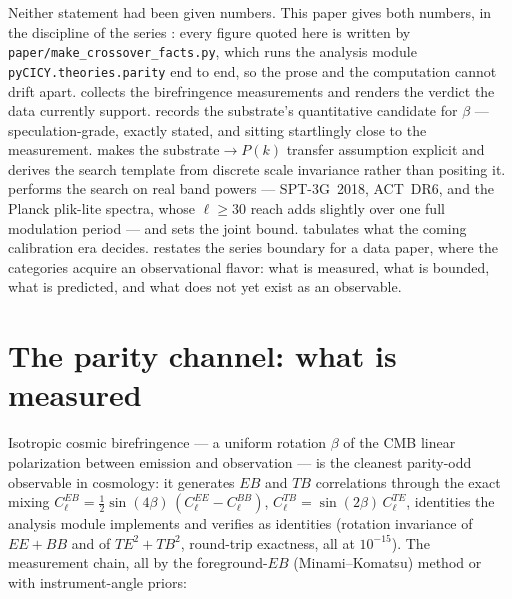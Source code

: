 \documentclass[11pt,a4paper]{article}
\theoremstyle{plain}
\theoremstyle{definition}
\begin{document}
Neither statement had been given numbers. This paper gives both numbers,
in the discipline of the series \cite{SuppMath,SuppStrings,SuppTwistor, SuppNariai, SuppMonotile}: 
every figure quoted here is written by
\texttt{paper/make\_crossover\_facts.py}, which runs the analysis module
\texttt{pyCICY.theories.parity} end to end, so the prose and the
computation cannot drift apart.  collects the
birefringence measurements and renders the verdict the data currently
support.  records the substrate's quantitative
candidate for $\beta$ --- speculation-grade, exactly stated, and sitting
startlingly close to the measurement.  makes the
substrate$\to$$P(k)$ transfer assumption explicit and derives the search
template from discrete scale invariance rather than positing it.
 performs the search on real band powers ---
SPT-3G~2018, ACT~DR6, and the Planck plik-lite spectra, whose
$\ell\ge30$ reach adds slightly over one full modulation period ---
and sets the joint bound.  tabulates what the
coming calibration era decides.  restates the
series boundary for a data paper, where the categories acquire an
observational flavor: what is measured, what is bounded, what is
predicted, and what does not yet exist as an observable.

\section{The parity channel: what is measured}
\label{sec:parity}

Isotropic cosmic birefringence --- a uniform rotation $\beta$ of the
CMB linear polarization between emission and observation --- is the
cleanest parity-odd observable in cosmology: it generates $EB$ and $TB$
correlations through the exact mixing
$C_{\ell}^{EB}=\tfrac12\sin(4\beta)\,(C_{\ell}^{EE}-C_{\ell}^{BB})$,
$C_{\ell}^{TB}=\sin(2\beta)\,C_{\ell}^{TE}$, identities the analysis
module implements and verifies as identities (rotation invariance of
$EE+BB$ and of $TE^{2}+TB^{2}$, round-trip exactness, all at
$10^{-15}$). The measurement chain, all by the foreground-$EB$
(Minami--Komatsu) method or with instrument-angle priors:
\end{document}
